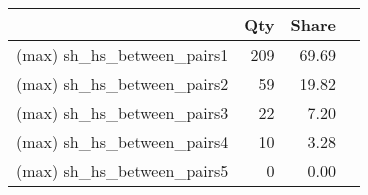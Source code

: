 \begin{table}
\centering
\caption{}
\begin{tabular}{l*{3}{r}}
\hline \hline
                    &         Qty&       Share\\
\midrule
(max) sh\_hs\_between\_pairs1&         209&       69.69\\
(max) sh\_hs\_between\_pairs2&          59&       19.82\\
(max) sh\_hs\_between\_pairs3&          22&        7.20\\
(max) sh\_hs\_between\_pairs4&          10&        3.28\\
(max) sh\_hs\_between\_pairs5&           0&        0.00\\
\hline \hline
\end{tabular}
\end{table}
